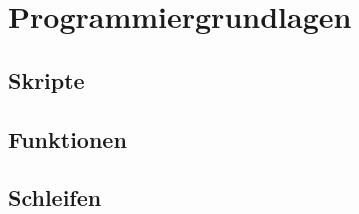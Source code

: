 \section{Programmiergrundlagen}
        \subsection{Skripte}
        \subsection{Funktionen}
        \subsection{Schleifen}